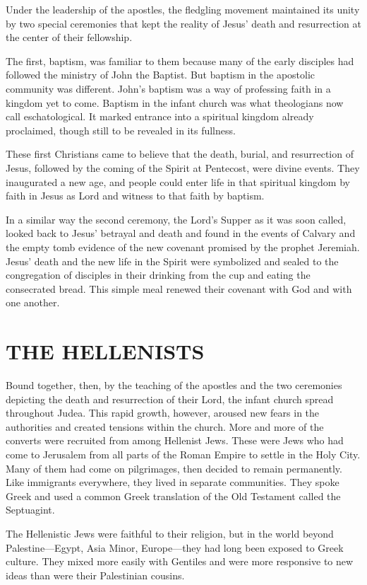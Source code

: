 Under the leadership of the apostles, the fledgling movement maintained its unity by two special
ceremonies that kept the reality of Jesus’ death and resurrection at the center of their fellowship.

The first, baptism, was familiar to them because many of the early disciples had followed the
ministry of John the Baptist. But baptism in the apostolic community was different. John’s baptism
was a way of professing faith in a kingdom yet to come. Baptism in the infant church was what
theologians now call eschatological. It marked entrance into a spiritual kingdom already proclaimed,
though still to be revealed in its fullness.

These first Christians came to believe that the death, burial, and resurrection of Jesus, followed
by the coming of the Spirit at Pentecost, were divine events. They inaugurated a new age, and people
could enter life in that spiritual kingdom by faith in Jesus as Lord and witness to that faith by
baptism.

In a similar way the second ceremony, the Lord’s Supper as it was soon called, looked back to Jesus’
betrayal and death and found in the events of Calvary and the empty tomb evidence of the new
covenant promised by the prophet Jeremiah. Jesus’ death and the new life in the Spirit were
symbolized and sealed to the congregation of disciples in their drinking from the cup and eating the
consecrated bread. This simple meal renewed their covenant with God and with one another.

\section{THE HELLENISTS}

Bound together, then, by the teaching of the apostles and the two ceremonies depicting the death and
resurrection of their Lord, the infant church spread throughout Judea. This rapid growth, however,
aroused new fears in the authorities and created tensions within the church. More and more of the
converts were recruited from among Hellenist Jews. These were Jews who had come to Jerusalem from
all parts of the Roman Empire to settle in the Holy City. Many of them had come on pilgrimages, then
decided to remain permanently. Like immigrants everywhere, they lived in separate communities. They
spoke Greek and used a common Greek translation of the Old Testament called the Septuagint.

The Hellenistic Jews were faithful to their religion, but in the world beyond Palestine—Egypt, Asia
Minor, Europe—they had long been exposed to Greek culture. They mixed more easily with Gentiles and
were more responsive to new ideas than were their Palestinian cousins.

